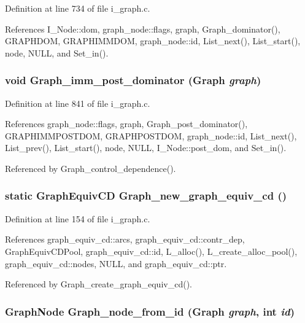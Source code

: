 Definition at line 734 of file i\_\-graph.c.

References I\_\-Node::dom, graph\_\-node::flags, graph, Graph\_\-dominator(), GRAPHDOM, GRAPHIMMDOM, graph\_\-node::id, List\_\-next(), List\_\-start(), node, NULL, and Set\_\-in().
\subsubsection{\setlength{\rightskip}{0pt plus 5cm}void Graph\_\-imm\_\-post\_\-dominator (\bf{Graph} {\em graph})}\label{i__graph_8c_61c52032649a28da1dacf08a943c9b83}




Definition at line 841 of file i\_\-graph.c.

References graph\_\-node::flags, graph, Graph\_\-post\_\-dominator(), GRAPHIMMPOSTDOM, GRAPHPOSTDOM, graph\_\-node::id, List\_\-next(), List\_\-prev(), List\_\-start(), node, NULL, I\_\-Node::post\_\-dom, and Set\_\-in().

Referenced by Graph\_\-control\_\-dependence().
\subsubsection{\setlength{\rightskip}{0pt plus 5cm}static \bf{Graph\-Equiv\-CD} Graph\_\-new\_\-graph\_\-equiv\_\-cd ()\hspace{0.3cm}{\tt  [static]}}\label{i__graph_8c_0a7cf0f0a9a4543d48574ac070dbeebe}




Definition at line 154 of file i\_\-graph.c.

References graph\_\-equiv\_\-cd::arcs, graph\_\-equiv\_\-cd::contr\_\-dep, Graph\-Equiv\-CDPool, graph\_\-equiv\_\-cd::id, L\_\-alloc(), L\_\-create\_\-alloc\_\-pool(), graph\_\-equiv\_\-cd::nodes, NULL, and graph\_\-equiv\_\-cd::ptr.

Referenced by Graph\_\-create\_\-graph\_\-equiv\_\-cd().
\subsubsection{\setlength{\rightskip}{0pt plus 5cm}\bf{Graph\-Node} Graph\_\-node\_\-from\_\-id (\bf{Graph} {\em graph}, int {\em id})}\label{i__graph_8c_fc757313a2a3d53b14f8254e8c85b374}




